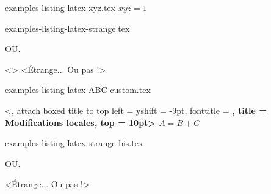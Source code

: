 \begin{filecontents*}[overwrite]{examples-listing-latex-xyz.tex}
$x y z = 1$
\end{filecontents*}


\begin{filecontents*}[overwrite]{examples-listing-latex-strange.tex}
\begin{tdoclatex}
\end{tdoclatex}
OU.
\begin{tdoclatex}<>
<Étrange... Ou pas !>
\end{tdoclatex}
\end{filecontents*}


\begin{filecontents*}[overwrite]{examples-listing-latex-ABC-custom.tex}
\begin{tdoclatex}%
    [linenos, style = igor]%
    <,
     attach boxed title to top left = {yshift = -9pt}, 
     fonttitle                      = \bfseries,
     title                          = Modifications locales,
     top                            = 10pt>
$A = B + C$
\end{tdoclatex}
\end{filecontents*}


\begin{filecontents*}[overwrite]{examples-listing-latex-strange-bis.tex}
\begin{tdoclatex}
\end{tdoclatex}
OU.
\begin{tdoclatex}
\string<Étrange... Ou pas !>
\end{tdoclatex}
\end{filecontents*}



\documentclass{tutodoc}

\usepackage[T1]{fontenc}

\usepackage{enumitem}

\usepackage[french]{babel, varioref}

\usepackage{multicol}
\usepackage{tasks}

\usepackage{pdfpages}

\newcommand\thisproj{\tdoccls{tutodoc}}
\newcommand\thisrepo{\url{https://github.com/bc-tools/for-latex/tree/tutodoc}}
\newcommand\thismonorepo{\url{https://github.com/bc-tools/for-latex}}

